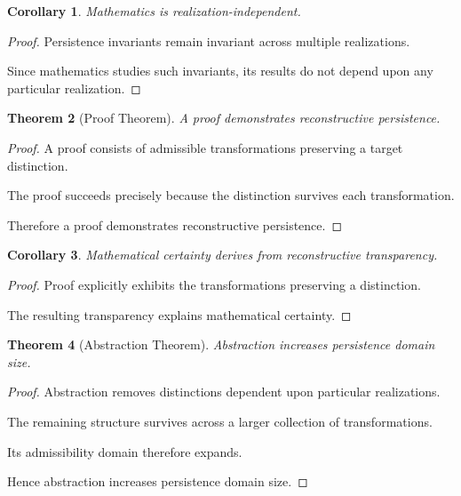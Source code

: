 \documentclass[12pt,oneside]{article}
\newtheorem{theorem}{Theorem}[section] \newtheorem{lemma}[theorem]{Lemma} \newtheorem{proposition}[theorem]{Proposition} \newtheorem{corollary}[theorem]{Corollary}
\theoremstyle{definition}
\begin{document}
\begin{corollary}

Mathematics is realization-independent.

\end{corollary}

\begin{proof}

Persistence invariants remain invariant across multiple realizations.

Since mathematics studies such invariants, its results do not depend upon any particular realization.

\end{proof}

\begin{theorem}[Proof Theorem]

A proof demonstrates reconstructive persistence.

\end{theorem}

\begin{proof}

A proof consists of admissible transformations preserving a target distinction.

The proof succeeds precisely because the distinction survives each transformation.

Therefore a proof demonstrates reconstructive persistence.

\end{proof}

\begin{corollary}

Mathematical certainty derives from reconstructive transparency.

\end{corollary}

\begin{proof}

Proof explicitly exhibits the transformations preserving a distinction.

The resulting transparency explains mathematical certainty.

\end{proof}

\begin{theorem}[Abstraction Theorem]

Abstraction increases persistence domain size.

\end{theorem}

\begin{proof}

Abstraction removes distinctions dependent upon particular realizations.

The remaining structure survives across a larger collection of transformations.

Its admissibility domain therefore expands.

Hence abstraction increases persistence domain size.

\end{proof}
\end{document}
